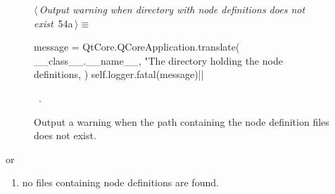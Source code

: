\documentclass[%
    a4paper,    %
    justified,  %
    nobib,      %
    openany     %
]{tufte-book}
\makeatletter
\renewcommand{\label}[1]{\@tufte@label{##1}}%
\def\tuftebreak{%
  \if@nobreak\else
    \par
    \ifdim\lastskip<\tufteskipamount
      \removelastskip \penalty -100
      \tufteskip
    \fi
  \fi
}
\makeatother
\begin{document}
\begin{figure}[!htbp]
  \begin{flushleft} \small
\begin{minipage}{\linewidth}\label{scrap9}\raggedright\small
{} $\langle\,${\itshape Output warning when directory with node definitions does not exist}\nobreak\ {\footnotesize {54a}}$\,\rangle\equiv$
\vspace{-1ex}
\begin{pythoncode}
    message = QtCore.QCoreApplication.translate(
        __class__.__name__,
        "The directory holding the node definitions, %
    )
    self.logger.fatal(message)|\NWsep|
\end{pythoncode}
\vspace{1.5ex}
\footnotesize
\begin{list}{}{\setlength{\itemsep}{-\parsep}\setlength{\itemindent}{-\leftmargin}}
\item \NWtxtMacroRefIn\ .

\item{}
\end{list}
\end{minipage}\vspace{4ex}
\end{flushleft}
\caption{Output a warning when the path containing the node definition files
    does not exist.}
\end{figure}

\tuftebreak{}or

\begin{enumerate}[resume]
  \item no files containing node definitions are found.
\end{enumerate}
\end{document}
